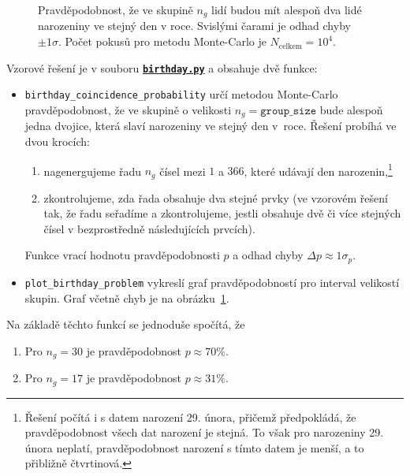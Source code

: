 \documentclass[a4paper,11pt,twoside]{article}
\def\code#1{\textnormal{\texttt{#1}}}
\def\ghfile#1#2{\textnormal{\textbf{\texttt{\href{https://github.com/PavelStransky/PCInPhysics2021/blob/main/#1#2}{#2}}}}}
\theoremstyle{red}
\theoremstyle{green}
\begin{document}
    \begin{solution}
        \begin{figure}[!htbp]
            \centering{}
            \caption{
                \protect\small
                Pravděpodobnost, že ve skupině $n_{g}$ lidí budou mít alespoň dva lidé narozeniny ve stejný den v roce.
                Svislými čarami je odhad chyby $\pm1\sigma$.
                Počet pokusů pro metodu Monte-Carlo je $N_{\text{celkem}}=10^{4}$.
            }
            \label{fig:BirthdayProblem}
        \end{figure}

        Vzorové řešení je v souboru \ghfile{python/montecarlo/}{birthday.py} a obsahuje dvě funkce:
        \begin{itemize}
            \item \code{birthday_coincidence_probability} 
                určí metodou Monte-Carlo pravděpodobnost, že ve skupině o velikosti $n_{g}=\mathtt{group\_size}$ bude alespoň jedna dvojice, která slaví narozeniny ve stejný den v~roce.
                Řešení probíhá ve dvou krocích: 
                \begin{enumerate}
                    \item nagenergujeme řadu $n_{g}$ čísel mezi $1$ a $366$, které udávají den narozenin,\footnote{
                        Řešení počítá i s datem narození 29. února, přičemž předpokládá, že pravděpodobnost všech dat narození je stejná.
                        To však pro narozeniny 29. února neplatí, pravděpodobnost narození s tímto datem je menší, a to přibližně čtvrtinová.
                    }
                    \item zkontrolujeme, zda řada obsahuje dva stejné prvky (ve vzorovém řešení tak, že řadu seřadíme a zkontrolujeme, jestli obsahuje dvě či více stejných čísel v bezprostředně následujících prvcích).
                \end{enumerate}
                Funkce vrací hodnotu pravděpodobnosti $p$ a odhad chyby $\Delta p\approx1\sigma_{p}$.
            \item \code{plot_birthday_problem}
                vykreslí graf pravděpodobností pro interval velikostí skupin.
                Graf včetně chyb je na obrázku~\ref{fig:BirthdayProblem}.
        \end{itemize}
        
        Na základě těchto funkcí se jednoduše spočítá, že
        \begin{enumerate}
            \item Pro $n_{g}=30$ je pravděpodobnost $p\approx70\%$.
            \item Pro $n_{g}=17$ je pravděpodobnost $p\approx31\%$. 
        \end{enumerate}


\end{solution}
\end{document}
